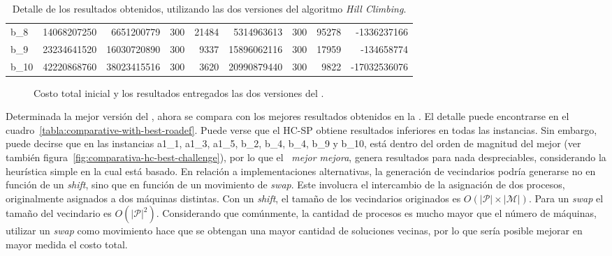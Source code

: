 \documentclass[../informe2.tex]{subfiles}
\begin{document}
\begin{table}[ht!]
{\begin{tabular}{@{}lrrrrrrrr@{}}
b\_8      & 14068207250                 & 6651200779             & 300                        & 21484                           & 5314963613                & 300                        & 95278                           & -1336237166                    \\
b\_9      & 23234641520                 & 16030720890            & 300                        & 9337                            & 15896062116               & 300                        & 17959                           & -134658774                     \\
b\_10     & 42220868760                 & 38023415516            & 300                        & 3620                            & 20990879440               & 300                        & 9822                            & -17032536076                   \\ \bottomrule
\end{tabular}}
\caption{\small Detalle de los resultados obtenidos, utilizando las dos versiones del algoritmo \textit{Hill Climbing}.}\label{tabla:hc-comparative}
\end{table}

\begin{figure}[ht!]
	\caption{\small Costo total inicial y los resultados entregados las dos versiones del \hillc.}\label{fig:comparativa-hc}
\end{figure}

\noindent Determinada la mejor versión del \hillc, ahora se compara con los mejores resultados obtenidos en la \roadef. El detalle puede encontrarse en el cuadro~\ref{tabla:comparative-with-best-roadef}. Puede verse que el HC-SP obtiene resultados inferiores en todas las instancias. Sin embargo, puede decirse que en las instancias a1\_1, a1\_3, a1\_5, b\_2, b\_4, b\_4, b\_9 y b\_10, está dentro del orden de magnitud del mejor (ver también figura~\ref{fig:comparativa-hc-best-challenge}), por lo que el \hillc\ \textit{mejor mejora}, genera resultados para nada despreciables, considerando la heurística simple en la cual está basado. En relación a implementaciones alternativas, la generación de vecindarios podría generarse no en función de un \textit{shift}, sino que en función de un movimiento de \textit{swap}. Este involucra el intercambio de la asignación de dos procesos, originalmente asignados a dos máquinas distintas. Con un \textit{shift}, el tamaño de los vecindarios originados es $O(|\mathcal{P}|\times|\mathcal{M}|)$. Para un \textit{swap} el tamaño del vecindario es $O(|\mathcal{P}|^{2})$. Considerando que comúnmente, la cantidad de procesos es mucho mayor que el número de máquinas, utilizar un \textit{swap} como movimiento hace que se obtengan una mayor cantidad de soluciones vecinas, por lo que sería posible mejorar en mayor medida el costo total.
\end{document}
